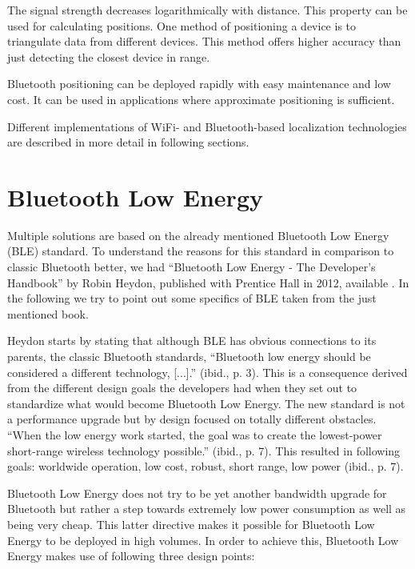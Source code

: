 The signal strength decreases logarithmically with distance. This property can be used for calculating positions. One method of positioning a device is to triangulate data from different devices. This method offers higher accuracy than just detecting the closest device in range.

Bluetooth positioning can be deployed rapidly with easy maintenance and low cost. It can be used in applications where approximate positioning is sufficient.

Different implementations of WiFi- and Bluetooth-based localization technologies are described in more detail in following sections.


\vspace{0.5cm}

\section{Bluetooth Low Energy}

Multiple solutions are based on the already mentioned Bluetooth Low Energy (BLE) standard. To understand the reasons for this standard in comparison to classic Bluetooth better, we had \enquote{Bluetooth Low Energy - The Developer's Handbook} by Robin Heydon, published with Prentice Hall in 2012, available \cite{heydon2012bluetooth}. In the following we try to point out some specifics of BLE taken from the just mentioned book.

Heydon starts by stating that although BLE has obvious connections to its parents, the classic Bluetooth standards, \enquote{Bluetooth low energy should be considered a different technology, [...].} (ibid., p. 3). This is a consequence derived from the different design goals the developers had when they set out to standardize what would become Bluetooth Low Energy. The new standard is not a performance upgrade but by design focused on totally different obstacles. \enquote{When the low energy work started, the goal was to create the lowest-power short-range wireless technology possible.} (ibid., p. 7). This resulted in following goals: worldwide operation, low cost, robust, short range, low power (ibid., p. 7).

Bluetooth Low Energy does not try to be yet another bandwidth upgrade for Bluetooth but rather a step towards extremely low power consumption as well as being very cheap. This latter directive makes it possible for Bluetooth Low Energy to be deployed in high volumes. In order to achieve this, Bluetooth Low Energy makes use of following three design points:

